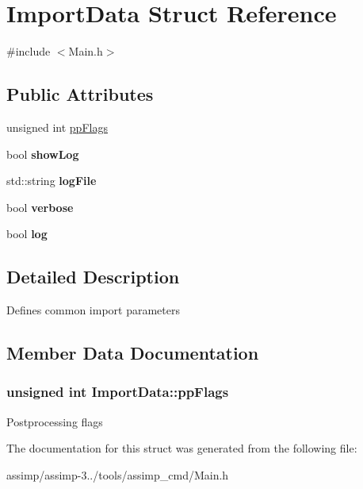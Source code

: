 \hypertarget{struct_import_data}{\section{Import\+Data Struct Reference}
\label{struct_import_data}
}


{\ttfamily \#include $<$Main.\+h$>$}

\subsection*{Public Attributes}
\begin{DoxyCompactItemize}
\item 
unsigned int \hyperlink{struct_import_data_af1972da0c112f425acdb65987fca9a3b}{pp\+Flags}
\item 
\hypertarget{struct_import_data_aeaea1b4c3005226da2c7d1ea88be63c8}{bool {\bfseries show\+Log}}\label{struct_import_data_aeaea1b4c3005226da2c7d1ea88be63c8}

\item 
\hypertarget{struct_import_data_aea687359ae42da533da8f576ecae51b8}{std\+::string {\bfseries log\+File}}\label{struct_import_data_aea687359ae42da533da8f576ecae51b8}

\item 
\hypertarget{struct_import_data_ab0ce811bc176d401e3dc4f596ad70e34}{bool {\bfseries verbose}}\label{struct_import_data_ab0ce811bc176d401e3dc4f596ad70e34}

\item 
\hypertarget{struct_import_data_ac7da3ed7bef7fc05d1c8d29a68e9f565}{bool {\bfseries log}}\label{struct_import_data_ac7da3ed7bef7fc05d1c8d29a68e9f565}

\end{DoxyCompactItemize}


\subsection{Detailed Description}
Defines common import parameters 

\subsection{Member Data Documentation}
\hypertarget{struct_import_data_af1972da0c112f425acdb65987fca9a3b}{
\subsubsection[{pp\+Flags}]{\setlength{\rightskip}{0pt plus 5cm}unsigned int Import\+Data\+::pp\+Flags}}\label{struct_import_data_af1972da0c112f425acdb65987fca9a3b}
Postprocessing flags 

The documentation for this struct was generated from the following file\+:\begin{DoxyCompactItemize}
\item 
assimp/assimp-\/3../tools/assimp\+\_\+cmd/Main.\+h\end{DoxyCompactItemize}
